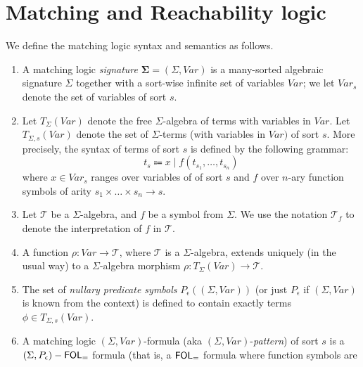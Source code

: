 \section{Matching and Reachability logic}\label{app:MLandRL}

\begin{definition}\label{def:matchinglogic}
We define the matching logic syntax and semantics as follows.
\begin{enumerate}
    \item A matching logic \emph{signature} $\mathbf{\Sigma} = (\Sigma, \mathit{Var})$ is a many-sorted algebraic signature $\Sigma$
          together with a sort-wise infinite set of variables $\mathit{Var}$;
          we let $\mathit{Var}_s$ denote the set of variables of sort $s$.
    \item Let $T_{\Sigma}(\mathit{Var})$ denote the free $\Sigma$-algebra of terms with variables 
          in $\mathit{Var}$.
          Let $T_{\Sigma, s}(\mathit{Var})$ denote the set of $\Sigma$-terms (with variables in $\mathit{Var})$ of sort $s$.
          More precisely, the syntax of terms of sort $s$ is defined by the following grammar:
          \begin{equation}
            t_s \Coloneqq x \mid f(t_{s_1}, \ldots, t_{s_n})
          \end{equation}
          where $x \in \mathit{Var}_s$ ranges over variables of of sort $s$ and $f$ over $n$-ary function symbols
          of arity $s_1 \times \ldots \times s_n \rightarrow s$.
    \item Let $\mathcal{T}$ be a $\Sigma$-algebra, and $f$ be a symbol from $\Sigma$.
          We use the notation $\mathcal{T}_f$ to denote the interpretation of $f$ in $\mathcal{T}$.
    \item A function $\rho : \mathit{Var} \to \mathcal{T}$, where $\mathcal{T}$ is a $\Sigma$-algebra,
          extends uniquely (in the usual way) to a $\Sigma$-algebra morphism
          $\rho : T_{\Sigma}(\mathit{Var}) \to \mathcal{T}$.
    \item The set of \emph{nullary predicate symbols} $P_\epsilon((\Sigma, \mathit{Var}))$
          (or just $P_\epsilon$ if $(\Sigma, \mathit{Var})$ is known from the context) is
          defined to contain exactly terms $\phi \in T_{\Sigma, s}(\mathit{Var})$.
    \item A matching logic $(\Sigma, \mathit{Var})$-formula (aka $(\Sigma, \mathit{Var})$-\emph{pattern})
          of sort $s$
          is a $(\Sigma, P_\epsilon)-\mathsf{FOL}_{=}$ formula (that is, a $\mathsf{FOL}_{=}$ formula where function symbols are

\end{enumerate}
\end{definition}
